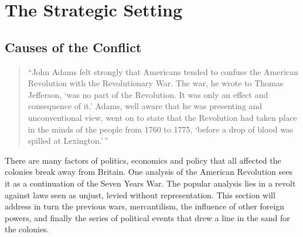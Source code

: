 \newpage
\section{The Strategic Setting}

\subsection{Causes of the Conflict}


\begin{quote}
  ``John Adams felt strongly that Americans tended to confuse the American 
  Revolution with the Revolutionary War. The war, he wrote to Thomas Jefferson,
  `was no part of the Revolution. It was only an effect and consequence of it.'
  Adams, well aware that he was presenting and unconventional view, went on to
  state that the Revolution had taken place in the minds of the people from 1760
  to 1775, `before a drop of blood was spilled at
  Lexington.'\,''\cite[15]{dupuy_1977}
\end{quote}

There are many factors of politics, economics and policy that all affected the
colonies break away from Britain. One analysis of the American Revolution sees it
as a continuation of the Seven Years War. 
The popular analysis lies in a revolt against laws seen as unjust, levied
without representation. This section will address in turn the previous wars,
mercantilism, the influence of other foreign powers, and finally the series of
political events that drew a line in the sand for the colonies.

